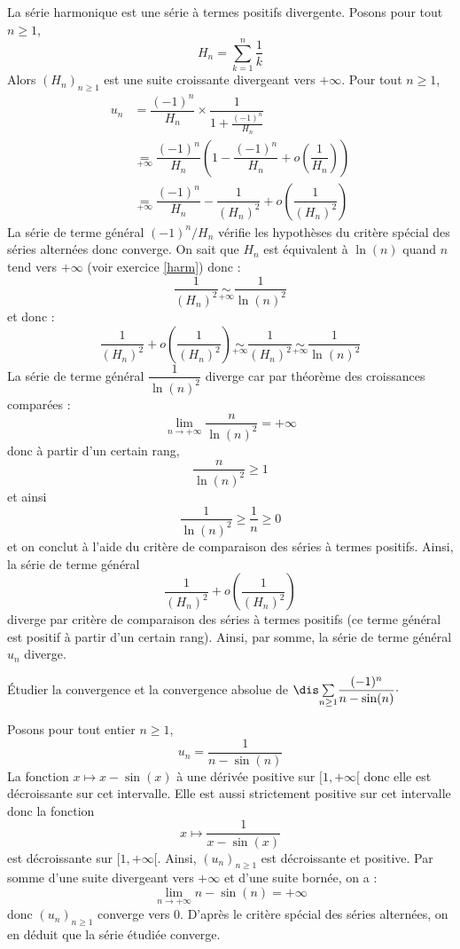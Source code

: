 \documentclass[a4paper,10pt]{report}
\newcommand{\Sum}[2]{\ensuremath{\textstyle{\sum\limits_{#1}^{#2}}}}
\begin{document}
\corr La série harmonique est une série à termes positifs divergente. Posons pour  tout $n \geq 1$,
$$ H_n = \sum_{k=1}^n \dfrac{1}{k}$$
Alors $(H_n)_{n \geq 1}$ est une suite croissante divergeant vers $+ \infty$. Pour tout $n \geq 1$,
\begin{align*}
u_n & = \dfrac{(-1)^n}{H_n} \times \dfrac{1}{1+ \frac{(-1)^n}{H_n}} \\
& \underset{+\infty}{=}  \dfrac{(-1)^n}{H_n} \left( 1 - \dfrac{(-1)^n}{H_n} + o \left( \dfrac{1}{H_n} \right) \right) \\
& \underset{+\infty}{=}  \dfrac{(-1)^n}{H_n}  -\dfrac{1}{(H_n)^2} + o \left( \dfrac{1}{(H_n)^2} \right) 
\end{align*}
La série de terme général $(-1)^n/H_n$ vérifie les hypothèses du critère spécial des séries alternées donc converge. On sait que $H_n$ est équivalent à $\ln(n)$ quand $n$ tend vers $+ \infty$ (voir exercice \ref{harm}) donc :
$$ \dfrac{1}{(H_n)^2} \underset{+ \infty}{\sim} \dfrac{1}{\ln(n)^2}$$
et donc :
$$ \dfrac{1}{(H_n)^2} + o \left( \dfrac{1}{(H_n)^2} \right)  \underset{+ \infty}{\sim}  \dfrac{1}{(H_n)^2} \underset{+ \infty}{\sim} \dfrac{1}{\ln(n)^2}$$
La série de terme général $\dfrac{1}{\ln(n)^2}$ diverge car par théorème des croissances comparées :
$$ \lim_{n \rightarrow + \infty} \dfrac{n}{\ln(n)^2} = + \infty$$
donc à partir d'un certain rang,
$$ \dfrac{n}{\ln(n)^2} \geq 1$$
et ainsi 
$$ \dfrac{1}{\ln(n)^2} \geq \dfrac{1}{n} \geq 0$$
et on conclut à l'aide du critère de comparaison des séries à termes positifs. Ainsi, la série de terme général 
$$\dfrac{1}{(H_n)^2} + o \left( \dfrac{1}{(H_n)^2} \right)$$
diverge par critère de comparaison des séries à termes positifs (ce terme général est positif à partir d'un certain rang). Ainsi, par somme, la série de terme général $u_n$ diverge.

\medskip

\begin{Exercice}{} Étudier la convergence et la convergence absolue de $\dis \Sum{n \geq 1}{} \dfrac{(-1)^n}{n-\sin(n)}\cdot$
\end{Exercice}

\corr Posons pour tout entier $n \geq 1$,
$$ u_n = \dfrac{1}{n-\sin(n)}$$
La fonction $x \mapsto x- \sin(x)$ à une dérivée positive sur $[1, + \infty[$ donc elle est décroissante sur cet intervalle. Elle est aussi strictement positive sur cet intervalle donc la fonction 
$$ x \mapsto \dfrac{1}{x-\sin(x)}$$
est décroissante sur $[1, + \infty[$. Ainsi, $(u_n)_{n \geq 1}$ est décroissante et positive. Par somme d'une suite divergeant vers $+ \infty$ et d'une suite bornée, on a :
$$ \lim_{n \rightarrow + \infty} n - \sin(n) = + \infty$$
donc $(u_n)_{n \geq 1}$ converge vers $0$. D'après le critère spécial des séries alternées, on en déduit que la série étudiée converge.
\end{document}
